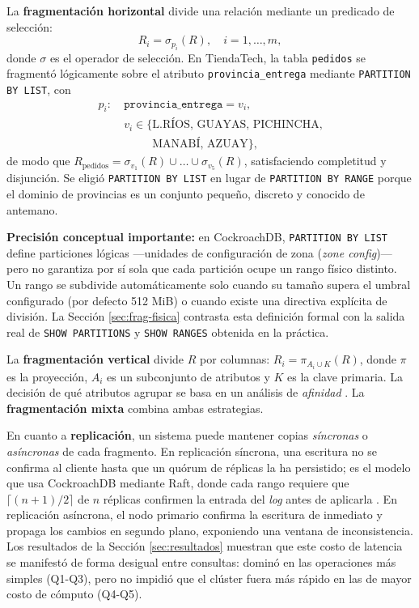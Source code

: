 \documentclass[10pt,letterpaper]{article}
\begin{document}
La \textbf{fragmentación horizontal} divide una relación mediante un predicado de selección:
\begin{equation}
R_i = \sigma_{p_i}(R), \quad i=1,\dots,m,
\end{equation}
donde $\sigma$ es el operador de selección. En TiendaTech, la tabla \texttt{pedidos} se fragmentó lógicamente sobre el atributo \texttt{provincia\_entrega} mediante \texttt{PARTITION BY LIST}, con
\begin{equation}
\begin{split}
p_i :\ & \texttt{provincia\_entrega} = v_i, \\
       & v_i \in \{\text{L.RÍOS, GUAYAS, PICHINCHA,}\\
       & \phantom{v_i \in \{{}} \text{MANABÍ, AZUAY}\},
\end{split}
\end{equation}
de modo que $R_{\text{pedidos}} = \sigma_{v_1}(R) \cup \dots \cup \sigma_{v_5}(R)$, satisfaciendo completitud y disjunción. Se eligió \texttt{PARTITION BY LIST} en lugar de \texttt{PARTITION BY RANGE} porque el dominio de provincias es un conjunto pequeño, discreto y conocido de antemano.

\textbf{Precisión conceptual importante:} en CockroachDB, \texttt{PARTITION BY LIST} define particiones lógicas —unidades de configuración de zona (\textit{zone config})— pero no garantiza por sí sola que cada partición ocupe un rango físico distinto. Un rango se subdivide automáticamente solo cuando su tamaño supera el umbral configurado (por defecto 512 MiB) o cuando existe una directiva explícita de división. La Sección \ref{sec:frag-fisica} contrasta esta definición formal con la salida real de \texttt{SHOW PARTITIONS} y \texttt{SHOW RANGES} obtenida en la práctica.

La \textbf{fragmentación vertical} divide $R$ por columnas: $R_i = \pi_{A_i \cup K}(R)$, donde $\pi$ es la proyección, $A_i$ es un subconjunto de atributos y $K$ es la clave primaria. La decisión de qué atributos agrupar se basa en un análisis de \textit{afinidad} \citep{ozsu2020}. La \textbf{fragmentación mixta} combina ambas estrategias.

En cuanto a \textbf{replicación}, un sistema puede mantener copias \textit{síncronas} o \textit{asíncronas} de cada fragmento. En replicación síncrona, una escritura no se confirma al cliente hasta que un quórum de réplicas la ha persistido; es el modelo que usa CockroachDB mediante Raft, donde cada rango requiere que $\lceil (n+1)/2 \rceil$ de $n$ réplicas confirmen la entrada del \textit{log} antes de aplicarla \citep{taft2020cockroachdb}. En replicación asíncrona, el nodo primario confirma la escritura de inmediato y propaga los cambios en segundo plano, exponiendo una ventana de inconsistencia. Los resultados de la Sección \ref{sec:resultados} muestran que este costo de latencia se manifestó de forma desigual entre consultas: dominó en las operaciones más simples (Q1-Q3), pero no impidió que el clúster fuera más rápido en las de mayor costo de cómputo (Q4-Q5).
\end{document}
